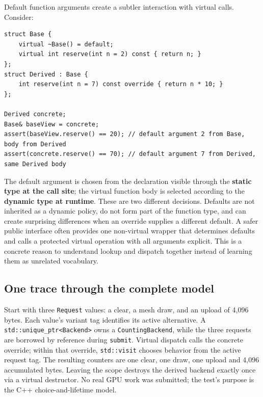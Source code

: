 Default function arguments create a subtler interaction with virtual calls. Consider:

\begin{verbatim}
struct Base {
    virtual ~Base() = default;
    virtual int reserve(int n = 2) const { return n; }
};
struct Derived : Base {
    int reserve(int n = 7) const override { return n * 10; }
};

Derived concrete;
Base& baseView = concrete;
assert(baseView.reserve() == 20); // default argument 2 from Base, body from Derived
assert(concrete.reserve() == 70); // default argument 7 from Derived, same Derived body
\end{verbatim}

The default argument is chosen from the declaration visible through the \textbf{static type at the call site}; the virtual function body is selected according to the \textbf{dynamic type at runtime}. These are two different decisions. Defaults are not inherited as a dynamic policy, do not form part of the function type, and can create surprising differences when an override supplies a different default. A safer public interface often provides one non-virtual wrapper that determines defaults and calls a protected virtual operation with all arguments explicit. This is a concrete reason to understand lookup and dispatch together instead of learning them as unrelated vocabulary.

\subsection{One trace through the complete model}\label{05-engine-i-ch004-one-trace-through-the-complete-model}

\hypertarget{05-engine-i-ch004-one-trace-through-the-complete-model}{}

Start with three \texttt{Request} values: a clear, a mesh draw, and an upload of 4,096 bytes. Each value's variant tag identifies its active alternative. A \texttt{std::unique\_ptr\textless{}Backend\textgreater{}} owns a \texttt{CountingBackend}, while the three requests are borrowed by reference during \texttt{submit}. Virtual dispatch calls the concrete override; within that override, \texttt{std::visit} chooses behavior from the active request tag. The resulting counters are one clear, one draw, one upload and 4,096 accumulated bytes. Leaving the scope destroys the derived backend exactly once via a virtual destructor. No real GPU work was submitted; the test's purpose is the C++ choice-and-lifetime model.

